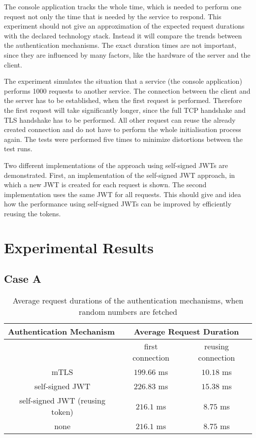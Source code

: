 The console application tracks the whole time, which is needed to perform one request not only the time that is needed by the service to respond.
This experiment should not give an approximation of the expected request durations with the declared technology stack.
Instead it will compare the trends between the authentication mechanisms.
The exact duration times are not important, since they are influenced by many factors, like the hardware of the server and the client.

The experiment simulates the situation that a service (the console application) performs 1000 requests to another service.
The connection between the client and the server has to be established, when the first request is performed.
Therefore the first request will take significantly longer, since the full TCP handshake and TLS handshake has to be performed.
All other request can reuse the already created connection and do not have to perform the whole initialisation process again.
The tests were performed five times to minimize distortions between the test runs.

Two different implementations of the approach using self-signed JWTs are demonstrated.
First, an implementation of the self-signed JWT approach, in which a new JWT is created for each request is shown.
The second implementation uses the same JWT for all requests.
This should give and idea how the performance using self-signed JWTs can be improved by efficiently reusing the tokens.

\section{Experimental Results}

\subsection{Case A}

\begin{table}[H]
\begin{tabular}{c|cc}
\multicolumn{1}{l|}{\textbf{Authentication Mechanism}} & \multicolumn{2}{c}{\textbf{Average Request Duration}} \\ \hline
\multicolumn{1}{c|}{} & \multicolumn{1}{c|}{first connection} & reusing connection \\ \hline
mTLS & \multicolumn{1}{c|}{$199.66$ ms} & $10.18$ ms \\ \hline
self-signed JWT & \multicolumn{1}{c|}{$226.83$ ms} & $15.38$ ms \\ \hline
self-signed JWT (reusing token) & \multicolumn{1}{c|}{$216.1$ ms} & $8.75$ ms \\ \hline
none & \multicolumn{1}{c|}{$216.1$ ms} & $8.75$ ms
\end{tabular}
\caption{Average request durations of the authentication mechanisms, when random numbers are fetched}
\label{tab:experiment_case_1}
\end{table}

